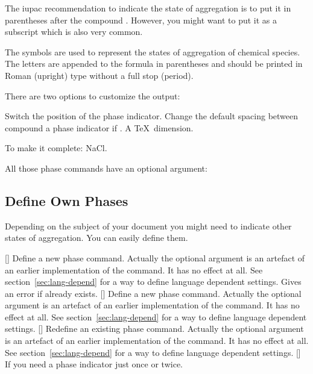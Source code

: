 \documentclass[load-preamble+]{cnltx-doc}
\begin{document}
The \ac{iupac} recommendation to indicate the state of aggregation is to put
it in parentheses after the compound \cite{iupac:greenbook}.  However, you
might want to put it as a subscript which is also very common.

\begin{cnltxquote}
  The \textelp{} symbols are used to represent the states of aggregation of
  chemical species.  The letters are appended to the formula in parentheses
  and should be printed in Roman (upright) type without a full stop (period).
\end{cnltxquote}

There are two options to customize the output:
\begin{options}
    Switch the position of the phase indicator.
  \Default{.1333em}
    Change the default spacing between compound a phase indicator if
    . A \TeX\ dimension.
\end{options}
\begin{example}
  \par
  To make it complete: NaCl\aq.
\end{example}

All those phase commands have an optional argument:
\begin{example}
\end{example}

\subsection{Define Own Phases}
Depending on the subject of your document you might need to indicate other
states of aggregation.  You can easily define them.
\begin{commands}
  []
    Define a new phase command.  Actually the optional
    argument is an artefact of an earlier implementation of the command.  It
    has no effect at all.  See section~\ref{sec:lang-depend} for a way to
    define language dependent settings.  Gives an error if  already
    exists.
  []
    Define a new phase command.  Actually the optional argument is an artefact
    of an earlier implementation of the command.  It has no effect at all.
    See section~\ref{sec:lang-depend} for a way to define language dependent
    settings.
  []
    Redefine an existing phase command.  Actually the optional argument is an
    artefact of an earlier implementation of the command.  It has no effect at
    all.  See section~\ref{sec:lang-depend} for a way to define language
    dependent settings.
  []
    If you need a phase indicator just once or twice.
\end{commands}
\end{document}
